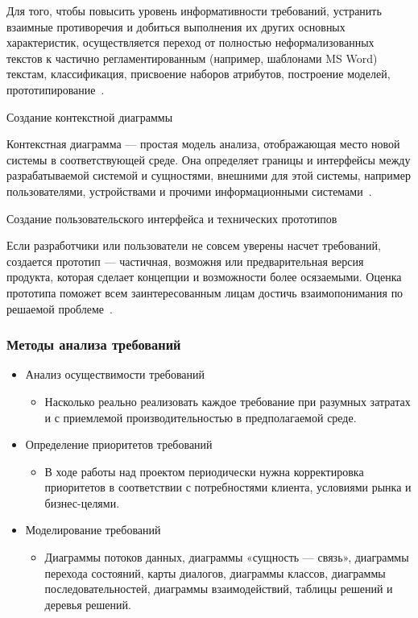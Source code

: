 \documentclass{../industrial-development}
\begin{document}
\lecturenotes

Для того, чтобы повысить уровень информативности требований, устранить взаимные противоречия и добиться выполнения их других основных характеристик, осуществляется переход от полностью неформализованных текстов к частично регламентированным (например, шаблонами MS Word) текстам, классификация, присвоение наборов атрибутов, построение моделей, прототипирование~\cite[с.~40]{Maglinec}.

\alert{Создание контекстной диаграммы}

Контекстная диаграмма — простая модель анализа, отображающая место новой системы в соответствующей среде. Она определяет границы и интерфейсы между разрабатываемой системой и сущностями, внешними для этой системы, например пользователями, устройствами и прочими информационными системами~\cite[с.~48]{Wiegers}.

\alert{Создание пользовательского интерфейса и технических прототипов}

Если разработчики или пользователи не совсем уверены насчет требований, создается прототип — частичная, возможня или предварительная версия продукта, которая сделает концепции и возможности более осязаемыми. Оценка прототипа поможет всем заинтересованным лицам достичь взаимопонимания по решаемой проблеме~\cite[с.~48]{Wiegers}.


\begin{frame} \frametitle{Методы анализа требований}
\begin{itemize}
\item  \alert{Анализ осуществимости требований} 
\begin{itemize}
\item Насколько реально реализовать каждое требование при разумных затратах и с приемлемой производительностью в предполагаемой среде.
\end{itemize}
\item \alert{Определение приоритетов требований} 
\begin{itemize}
\item В ходе работы над проектом периодически нужна корректировка приоритетов
в соответствии с потребностями клиента, условиями рынка и бизнес-целями.
\end{itemize}
\item \alert{Моделирование требований} 
\begin{itemize}
\item Диаграммы потоков данных, диаграммы «сущность — связь», диаграммы перехода состояний, карты диалогов, диаграммы классов, диаграммы последовательностей, диаграммы взаимодействий, таблицы решений и деревья решений.
\end{itemize}
\end{itemize}
\end{frame}
\end{document}
